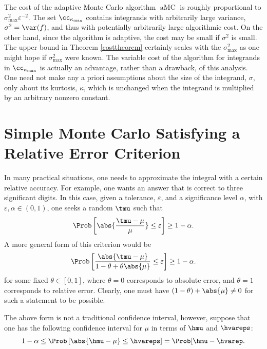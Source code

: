 \documentclass[graybox]{svmult}
\DeclareMathOperator{\aMC}{aMC}
\begin{document}
The cost of the adaptive Monte Carlo algorithm $\aMC$ is roughly proportional to $\sigma^2_{\max}\varepsilon^{-2}$.  The set $\cc_{\kappa_{\max}}$ contains integrands with arbitrarily large variance, $\sigma^2=\var(f)$, and thus with potentially arbitrarily large algorithmic cost.  On the other hand, since the algorithm is adaptive, the cost may be small if $\sigma^2$ is small.  The upper bound in Theorem \ref{costtheorem} certainly scales with the $\sigma^2_{\max}$ as one might hope if $\sigma^2_{\max}$ were known.  The variable cost of the algorithm for integrands in $\cc_{\kappa_{\max}}$ is actually an advantage, rather than a drawback, of this analysis.  One need not make any a priori assumptions about the size of the integrand, $\sigma$, only about its kurtosis, $\kappa$, which is unchanged when the integrand is multiplied by an arbitrary nonzero constant.

\section{Simple Monte Carlo Satisfying a Relative Error Criterion} \label{relerrsec}

In many practical situations, one needs to approximate the integral with a certain relative accuracy.  For example, one wants an answer that is correct to three significant digits.  In this case, given a tolerance, $\varepsilon$, and a significance level $\alpha$, with $\varepsilon, \alpha \in (0, 1)$, one seeks a random $\tmu$ such that 
\begin{equation} \label{relerrcrit}
\Prob\left[\abs{\frac{\tmu-\mu}{\mu}} \le \varepsilon \right] \geq 1-\alpha.
\end{equation}
A more general form of this criterion would be
\begin{equation} \label{genrelerrcrit}
\Prob\left[\frac{\abs{\tmu-\mu}} {1-\theta + \theta\abs{\mu}} \le \varepsilon \right] \geq 1-\alpha.
\end{equation}
for some fixed $\theta \in [0,1]$, where $\theta=0$ corresponds to absolute error, and $\theta = 1$ corresponds to relative error.
Clearly, one must have $(1-\theta) + \abs{\mu}\ne0$ for such a statement to be possible.  

The above form is not a traditional confidence interval, however, suppose that one has the following confidence interval for $\mu$ in terms of $\hmu$ and $\hvareps$: 
\begin{equation} \label{relerrcritc}
1-\alpha \le \Prob\left[\abs{\hmu-\mu} \le \hvareps \right] = \Prob[\hmu-\hvarep.
\end{equation}
\end{document}
